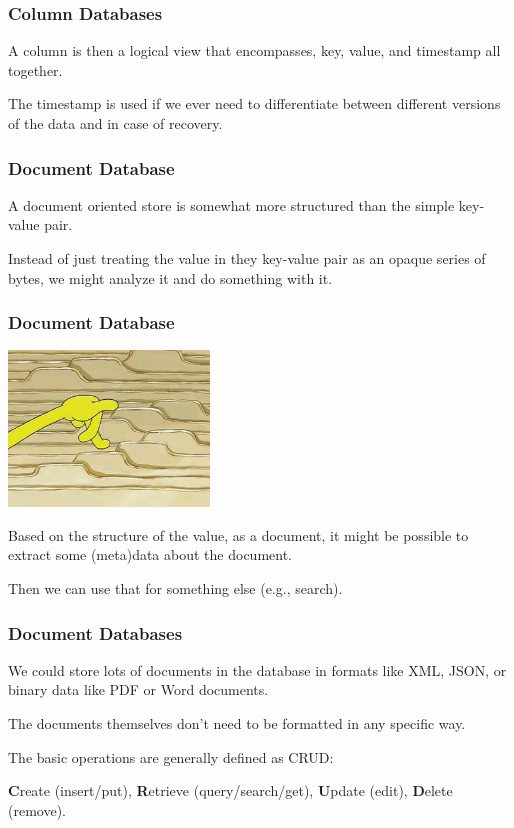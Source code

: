 \begin{frame}
\frametitle{Column Databases}

 A column is then a logical view that encompasses, key, value, and timestamp all together. 
 
 The timestamp is used if we ever need to differentiate between different versions of the data and in case of recovery.


\end{frame}


\begin{frame}
\frametitle{Document Database}

A document oriented store is somewhat more structured than the simple key-value pair. 

Instead of just treating the value in they key-value pair as an opaque series of bytes, we might analyze it and do something with it. 

\end{frame}


\begin{frame}
\frametitle{Document Database}

\begin{center}
	\includegraphics[width=0.4\textwidth]{images/folders.jpg}
\end{center}

Based on the structure of the value, as a document, it might be possible to extract some (meta)data about the document. 

Then we can use that for something else (e.g., search). 

\end{frame}



\begin{frame}
\frametitle{Document Databases}

We could store lots of documents in the database in formats like XML, JSON, or binary data like PDF or Word documents.

The documents themselves don't need to be formatted in any specific way.

The basic operations are generally defined as CRUD:

\textbf{C}reate (insert/put), \textbf{R}etrieve (query/search/get), \textbf{U}pdate (edit), \textbf{D}elete (remove).

\end{frame}



